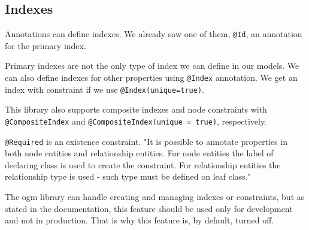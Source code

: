 
\subsection {Indexes}

Annotations can define indexes. We already saw one of them, \texttt{@Id}, an annotation for the primary index.

Primary indexes are not the only type of index we can define in our models. We can also define indexes for other
properties using \texttt{@Index} annotation. We get an index with constraint if we use \texttt{@Index(unique=true)}.

This library also supports composite indexes and node constraints with \texttt{@CompositeIndex} and \texttt{@CompositeIndex(unique = true)}, respectively.

\texttt{@Required} is an existence constraint. "It is possible to annotate properties in both node entities and relationship entities. For node entities
the label of declaring class is used to create the constraint. For relationship entities the relationship type is used - such type must
be defined on leaf class." \cite{noauthor_reference_nodate}

The \acrshort{ogm} library can handle creating and managing indexes or constraints, but as stated in the documentation, this feature should be used only for development
and not in production. That is why this feature is, by default, turned off.


